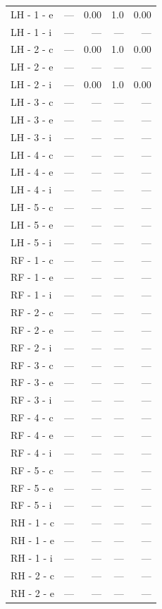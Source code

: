 \documentclass[a4paper,11pt]{article}
\begin{document}
\begin{small}
\begin{longtable}{p{4.5cm}rrrr}
LH - 1 - e & --- & 0.00 & 1.0 & 0.00 \\
LH - 1 - i & --- & --- & --- & --- \\
LH - 2 - c & --- & 0.00 & 1.0 & 0.00 \\
LH - 2 - e & --- & --- & --- & --- \\
LH - 2 - i & --- & 0.00 & 1.0 & 0.00 \\
LH - 3 - c & --- & --- & --- & --- \\
LH - 3 - e & --- & --- & --- & --- \\
LH - 3 - i & --- & --- & --- & --- \\
LH - 4 - c & --- & --- & --- & --- \\
LH - 4 - e & --- & --- & --- & --- \\
LH - 4 - i & --- & --- & --- & --- \\
LH - 5 - c & --- & --- & --- & --- \\
LH - 5 - e & --- & --- & --- & --- \\
LH - 5 - i & --- & --- & --- & --- \\
RF - 1 - c & --- & --- & --- & --- \\
RF - 1 - e & --- & --- & --- & --- \\
RF - 1 - i & --- & --- & --- & --- \\
RF - 2 - c & --- & --- & --- & --- \\
RF - 2 - e & --- & --- & --- & --- \\
RF - 2 - i & --- & --- & --- & --- \\
RF - 3 - c & --- & --- & --- & --- \\
RF - 3 - e & --- & --- & --- & --- \\
RF - 3 - i & --- & --- & --- & --- \\
RF - 4 - c & --- & --- & --- & --- \\
RF - 4 - e & --- & --- & --- & --- \\
RF - 4 - i & --- & --- & --- & --- \\
RF - 5 - c & --- & --- & --- & --- \\
RF - 5 - e & --- & --- & --- & --- \\
RF - 5 - i & --- & --- & --- & --- \\
RH - 1 - c & --- & --- & --- & --- \\
RH - 1 - e & --- & --- & --- & --- \\
RH - 1 - i & --- & --- & --- & --- \\
RH - 2 - c & --- & --- & --- & --- \\
RH - 2 - e & --- & --- & --- & --- \\

\end{longtable}
\end{small}
\end{document}
